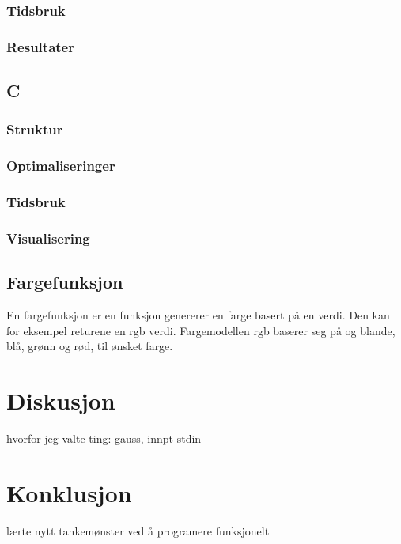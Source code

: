 \documentclass[10pt,a4paper, norsk]{article}
\begin{document}
\subsubsection{Tidsbruk}
\subsubsection{Resultater}



\subsection{C}

\subsubsection{Struktur}
\subsubsection{Optimaliseringer}
\subsubsection{Tidsbruk}
\subsubsection{Visualisering}




\subsection{Fargefunksjon}
En fargefunksjon er en funksjon genererer en farge basert på en verdi. Den kan for eksempel returene en rgb verdi. Fargemodellen rgb baserer seg på og blande, blå, grønn og rød, til ønsket farge. 


\section{Diskusjon}

hvorfor jeg valte ting: gauss, innpt stdin

\section{Konklusjon}

lærte nytt tankemønster ved å programere funksjonelt

\paragraph{} 
\end{document}
